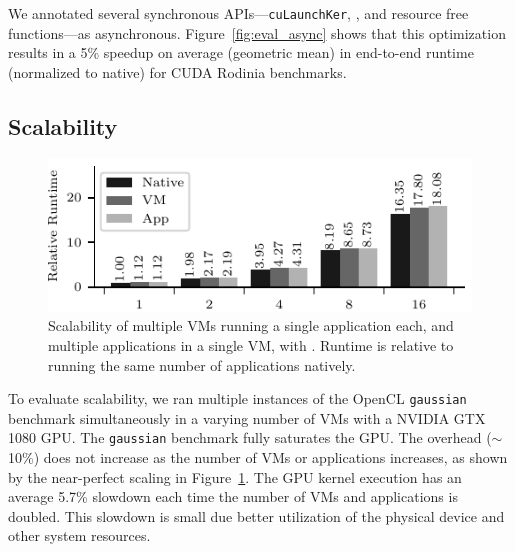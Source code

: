 We annotated several synchronous APIs---\lstinline[breaklines=true,escapechar=|]@cuLaunchKer@\-\lstinline@nel@, \lstinline@cuMemcpyHtoD@, and resource free functions---as asynchronous.
Figure~\ref{fig:eval_async} shows that this optimization results in a 5\% speedup on average (geometric mean) in end-to-end runtime (normalized to native) for CUDA Rodinia benchmarks.

\subsection{Scalability}
\begin{figure}
	\centering
	\includegraphics[width=.95\linewidth]{ava/data/scalability/scalability.pdf}%
	\vspace{-0.4em}
	\caption{Scalability of multiple VMs running a single application each, and multiple applications in a single VM,  with \model. Runtime is relative to running the same number of applications natively.}
	\label{fig:scalability}
	\vspace*{-.25em}
\end{figure}

To evaluate scalability, we ran multiple instances of the OpenCL \texttt{gaussian} benchmark
simultaneously in a varying number of VMs with a NVIDIA GTX 1080 GPU. The \texttt{gaussian} benchmark fully saturates the GPU.
The \model overhead ($\sim$10\%) does not increase as the number of VMs or applications increases,
as shown by the near-perfect scaling in Figure~\ref{fig:scalability}.
The GPU kernel execution has an average 5.7\% slowdown each time the number of VMs and applications is doubled.
This slowdown is small due
better utilization of the physical device and other system resources.

